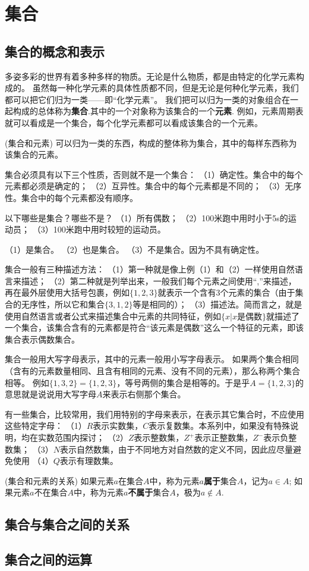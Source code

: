 \section{集合}
\subsection{集合的概念和表示}
多姿多彩的世界有着多种多样的物质。无论是什么物质，都是由特定的化学元素构成的。
虽然每一种化学元素的具体性质都不同，但是无论是何种化学元素，我们都可以把它们归为一类——即“化学元素”。
我们把可以归为一类的对象组合在一起构成的总体称为\textbf{集合}.其中的一个对象称为该集合的一个\textbf{元素}.
例如，元素周期表就可以看成是一个集合，每个化学元素都可以看成该集合的一个元素。
\begin{definition}(集合和元素)
    可以归为一类的东西，构成的整体称为集合，其中的每样东西称为该集合的元素。
\end{definition}

集合必须具有以下三个性质，否则就不是一个集合：
（1）确定性。集合中的每个元素都必须是确定的；
（2）互异性。集合中的每个元素都是不同的；
（3）无序性。集合中的每个元素都没有顺序。

\begin{example}
    以下哪些是集合？哪些不是？
    （1）所有偶数；
    （2）100米跑中用时小于5s的运动员；
    （3）100米跑中用时较短的运动员。
\end{example}

\begin{solution}
    （1）是集合。
    （2）也是集合。
    （3）不是集合。因为不具有确定性。
\end{solution}

集合一般有三种描述方法：
（1）第一种就是像上例（1）和（2）一样使用自然语言来描述；
（2）第二种就是列举出来，一般我们每个元素之间使用“,”来描述，再在最外层使用大括号包裹，例如$\{1,2,3\}$就表示一个含有3个元素的集合（由于集合的无序性，所以它和集合$\{3,1,2\}$等是相同的）；
（3）描述法。简而言之，就是使用自然语言或者公式来描述集合中元素的共同特征，例如$\{x|x是偶数\}$就描述了一个集合，该集合含有的元素都是符合“该元素是偶数”这么一个特征的元素，即该集合表示偶数集合。

集合一般用大写字母表示，其中的元素一般用小写字母表示。
如果两个集合相同（含有的元素数量相同、且含有相同的元素、没有不同的元素），那么称两个集合相等。
例如$\{1,3,2\}=\{1,2,3\}$，等号两侧的集合是相等的。于是乎$A=\{1,2,3\}$的意思就是说说用大写字母$A$来表示右侧那个集合。

有一些集合，比较常用，我们用特别的字母来表示，在表示其它集合时，不应使用这些特定字母：
（1）$R$表示实数集，$C$表示复数集。本系列中，如果没有特殊说明，均在实数范围内探讨；
（2）$Z$表示整数集，$Z^+$表示正整数集，$Z^-$表示负整数集；
（3）$N$表示自然数集，由于不同地方对自然数的定义不同，因此应尽量避免使用
（4）$Q$表示有理数集。

\begin{definition}(集合和元素的关系)
    如果元素$a$在集合$A$中，称为元素$a$\textbf{属于}集合$A$，记为$a \in A$;
    如果元素$a$不在集合$A$中，称为元素$a$\textbf{不属于}集合$A$，极为$a \notin A$. 
\end{definition}

\subsection{集合与集合之间的关系}

\subsection{集合之间的运算}